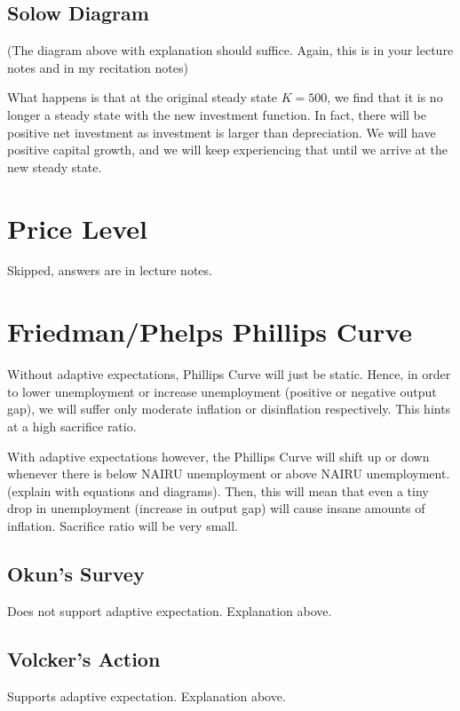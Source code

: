 \documentclass[11pt]{scrartcl}
\begin{document}
\subsection{Solow Diagram}

(The diagram above with explanation should suffice. Again, this is in your lecture notes and in my recitation notes)

What happens is that at the original steady state $K=500$, we find that it is no longer a steady state with the new investment function. In fact, there will be positive net investment as investment is larger than depreciation. We will have positive capital growth, and we will keep experiencing that until we arrive at the new steady state.

\section{Price Level}

Skipped, answers are in lecture notes. 

\section{Friedman/Phelps Phillips Curve}

Without adaptive expectations, Phillips Curve will just be static. Hence, in order to lower unemployment or increase unemployment (positive or negative output gap), we will suffer only moderate inflation or disinflation respectively. This hints at a high sacrifice ratio. 

With adaptive expectations however, the Phillips Curve will shift up or down whenever there is below NAIRU unemployment or above NAIRU unemployment. (explain with equations and diagrams). Then, this will mean that even a tiny drop in unemployment (increase in output gap) will cause insane amounts of inflation. Sacrifice ratio will be very small.

\subsection{Okun's Survey}

Does not support adaptive expectation. Explanation above.

\subsection{Volcker's Action}

Supports adaptive expectation. Explanation above.
\end{document}
